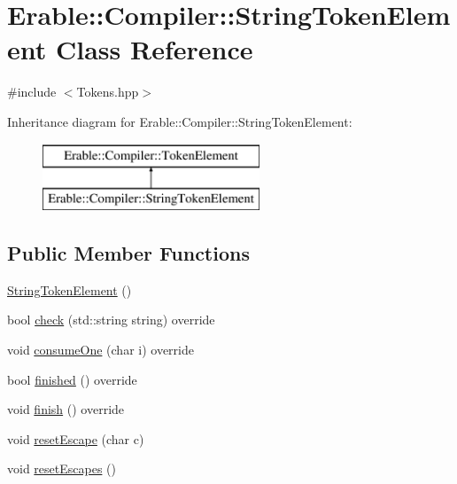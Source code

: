 \hypertarget{class_erable_1_1_compiler_1_1_string_token_element}{}\section{Erable\+::Compiler\+::String\+Token\+Element Class Reference}
\label{class_erable_1_1_compiler_1_1_string_token_element}


{\ttfamily \#include $<$Tokens.\+hpp$>$}

Inheritance diagram for Erable\+::Compiler\+::String\+Token\+Element\+:\begin{figure}[H]
\begin{center}
\leavevmode
\includegraphics[height=2.000000cm]{class_erable_1_1_compiler_1_1_string_token_element}
\end{center}
\end{figure}
\subsection*{Public Member Functions}
\begin{DoxyCompactItemize}
\item 
\mbox{\hyperlink{class_erable_1_1_compiler_1_1_string_token_element_a67cb17bbd6d478c79ac3d9322a574fa7}{String\+Token\+Element}} ()
\item 
bool \mbox{\hyperlink{class_erable_1_1_compiler_1_1_string_token_element_a25c4ee04b4aac868110d5a7d6fa6e965}{check}} (std\+::string string) override
\item 
void \mbox{\hyperlink{class_erable_1_1_compiler_1_1_string_token_element_a8db2f3d10cc46b873ccfb7db8c90c709}{consume\+One}} (char i) override
\item 
bool \mbox{\hyperlink{class_erable_1_1_compiler_1_1_string_token_element_a0fa477d39992b60c916c083ea90f1526}{finished}} () override
\item 
void \mbox{\hyperlink{class_erable_1_1_compiler_1_1_string_token_element_acf6ab613a09eb8220be24a83d3e28490}{finish}} () override
\item 
void \mbox{\hyperlink{class_erable_1_1_compiler_1_1_string_token_element_a7365b5382b57a6c01c7a77a5d8c6e5f6}{reset\+Escape}} (char c)
\item 
void \mbox{\hyperlink{class_erable_1_1_compiler_1_1_string_token_element_a2cab1cd560d82631ce7938cb52a26ac1}{reset\+Escapes}} ()
\end{DoxyCompactItemize}
